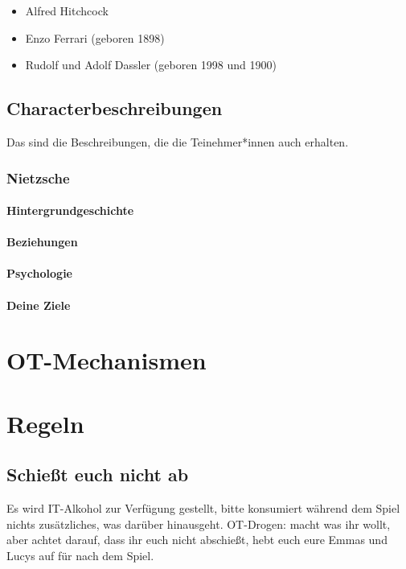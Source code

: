\documentclass[12pt, a4paper, openany]{report}
\begin{document}
\begin{itemize}
	\item Alfred Hitchcock
\end{itemize}

\begin{itemize}
	\item Enzo Ferrari (geboren 1898)
	\item Rudolf und Adolf Dassler (geboren 1998 und 1900)
\end{itemize}
\section{Characterbeschreibungen}
Das sind die Beschreibungen, die die Teinehmer*innen auch erhalten.

\subsection{Nietzsche}
\subsubsection{Hintergrundgeschichte}
\subsubsection{Beziehungen}
\subsubsection{Psychologie}
\subsubsection{Deine Ziele}


\chapter{OT-Mechanismen}

\chapter{Regeln}
\section{Schießt euch nicht ab}
Es wird IT-Alkohol zur Verfügung gestellt, bitte konsumiert während dem Spiel nichts zusätzliches, was darüber hinausgeht.
OT-Drogen: macht was ihr wollt, aber achtet darauf, dass ihr euch nicht abschießt, hebt euch eure Emmas und Lucys auf für nach dem Spiel.
\end{document}
